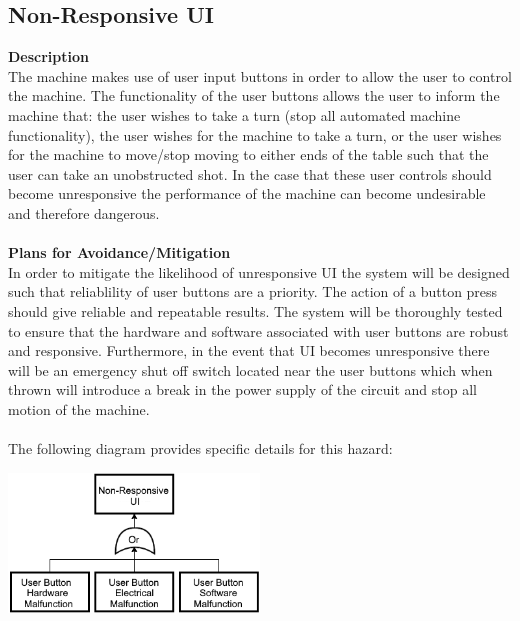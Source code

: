 \documentclass[titlepage]{article}
\begin{document}
\subsection{Non-Responsive UI}
\textbf{Description}\\
The machine makes use of user input buttons in order to allow the user to control the machine. The functionality of the user buttons allows the user to inform the machine that: the user wishes to take a turn (stop all automated machine functionality), the user wishes for the machine to take a turn, or the user wishes for the machine to move/stop moving to either ends of the table such that the user can take an unobstructed shot. In the case that these user controls should become unresponsive the performance of the machine can become undesirable and therefore dangerous.\\~\\
\textbf{Plans for Avoidance/Mitigation}\\
In order to mitigate the likelihood of unresponsive UI the system will be designed such that reliablility of user buttons are a priority. The action of a button press should give reliable and repeatable results. The system will be thoroughly tested to ensure that the hardware and software associated with user buttons are robust and responsive. Furthermore, in the event that UI becomes unresponsive there will be an emergency shut off switch located near the user buttons which when thrown will introduce a break in the power supply of the circuit and stop all motion of the machine.\\~\\
The following diagram provides specific details for this hazard:
\begin{center}
	\includegraphics[width=0.5\textwidth]{NonResponsiveUIFTA.png}
\label{fig:yRailFig}
\end{center}

\newpage
\end{document}
